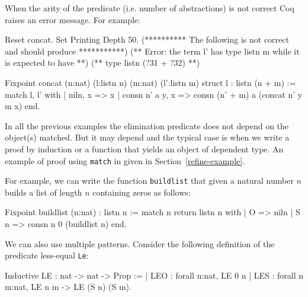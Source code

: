 When the arity of the predicate (i.e. number of abstractions) is not
correct Coq raises an error message. For example:

\begin{coq_eval}
Reset concat.
Set Printing Depth 50.
(********** The following is not correct and should produce ***********)
(** Error: the term l' has type listn m while it is expected to have **)
(** type listn (?31 + ?32)                                           **)
\end{coq_eval}
\begin{coq_example}
Fixpoint concat
 (n:nat) (l:listn n) (m:nat)
 (l':listn m) {struct l} : listn (n + m) :=
  match l, l' with
  | niln, x => x
  | consn n' a y, x => consn (n' + m) a (concat n' y m x)
  end.
\end{coq_example}

In all the previous examples the elimination predicate does not depend
on the object(s) matched. But it may depend and the typical case 
is when we write a proof by induction or a function that yields an
object of dependent type. An example of proof using \texttt{match} in
given in Section~\ref{refine-example}.

For example, we can write 
the function \texttt{buildlist} that given a natural number
$n$ builds a list of length $n$ containing zeros as follows:

\begin{coq_example}
Fixpoint buildlist (n:nat) : listn n :=
  match n return listn n with
  | O => niln
  | S n => consn n 0 (buildlist n)
  end.
\end{coq_example}

We can also use multiple patterns. 
Consider the following definition of the predicate less-equal
\texttt{Le}:

\begin{coq_example}
Inductive LE : nat -> nat -> Prop :=
  | LEO : forall n:nat, LE 0 n
  | LES : forall n m:nat, LE n m -> LE (S n) (S m).
\end{coq_example}


